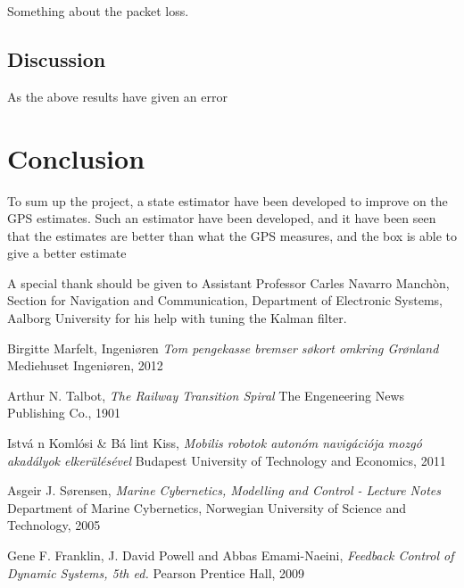 \documentclass{ifacconf}
\begin{document}
Something about the packet loss. 

\subsection{Discussion}

As the above results have given an error 


\section{Conclusion}
To sum up the project, a state estimator have been developed to improve on the GPS estimates. Such an estimator have been developed, and it have been seen that the estimates are better than what the GPS measures, and the box is able to give a better estimate 

\begin{ack}                               %
A special thank should be given to Assistant Professor Carles Navarro Manchòn, Section for Navigation and Communication, Department of Electronic Systems, Aalborg University for his help with tuning the Kalman filter.  %
\end{ack}

%

\begin{thebibliography}{xx}

Birgitte Marfelt,
\newblock Ingeni\o ren
\newblock \emph{Tom pengekasse bremser søkort omkring Gr\o nland}
\newblock Mediehuset Ingeniøren, 2012

Arthur N. Talbot,
\newblock \emph{The Railway Transition Spiral}
\newblock The Engeneering News Publishing Co., 1901

Istv\'a n Koml\'{o}si \& B\'a lint Kiss, %
\newblock \emph{Mobilis robotok auton\'{o}m navig\'aci\'{o}ja mozg\'{o} akad\'alyok elker\"ul\'es\'evel} %
\newblock Budapest University of Technology and Economics, 2011 %

Asgeir J. S\o rensen,
\newblock \emph{Marine Cybernetics, Modelling and Control - Lecture Notes}
\newblock Department of Marine Cybernetics, Norwegian University of Science and Technology, 2005

Gene F. Franklin, J. David Powell and Abbas Emami-Naeini,
\newblock \emph{Feedback Control of Dynamic Systems, 5th ed.}
\newblock Pearson Prentice Hall, 2009

\end{thebibliography}
\end{document}
